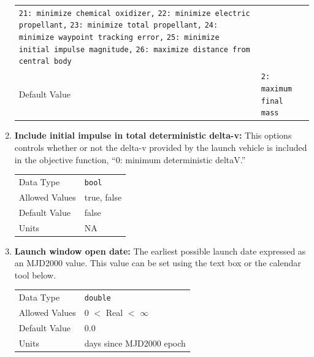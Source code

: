 \begin{enumerate}
\begin{table}[H]
\begin{tabular}{lp{5cm}}
                             \verb|21: minimize chemical oxidizer,| \newline
                             \verb|22: minimize electric propellant,| \newline
                             \verb|23: minimize total propellant,| \newline
                             \verb|24: minimize waypoint tracking error,| \newline
                             \verb|25: minimize initial impulse magnitude,| \newline
                             \verb|26: maximize distance from central body| \\
            Default Value & \verb|2: maximum final mass| \\
            \end{tabular}
        \end{table}

    \item \textbf{Include initial impulse in total deterministic delta-v:} This options controls whether or not the delta-v provided by the launch vehicle is included in the objective function, ``0: minimum deterministic deltaV.''
        
        \begin{table}[H]
            \hspace{2cm}
            \begin{tabular}{ll}
            Data Type & \verb|bool| \\
            Allowed Values & true, false \\
            Default Value & false \\
            Units & NA
            \end{tabular}
        \end{table}

    \item \textbf{Launch window open date:} The earliest possible launch date expressed as an MJD2000 value. This value can be set using the text box or the calendar tool below.
    
        \begin{table}[H]
            \hspace{2cm}
            \begin{tabular}{ll}
            Data Type & \verb|double| \\
            Allowed Values & 0 $<$ Real $<$ $\infty$ \\
            Default Value & 0.0 \\
            Units & days since MJD2000 epoch
            \end{tabular}
        \end{table}
    

\end{enumerate}
